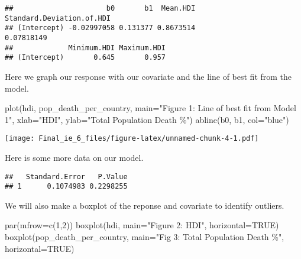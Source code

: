 \documentclass[
  12pt,
]{article}
\newenvironment{Shaded}{\begin{snugshade}}{\end{snugshade}}
\newcommand{\AttributeTok}[1]{\textcolor[rgb]{0.77,0.63,0.00}{#1}}
\newcommand{\ConstantTok}[1]{\textcolor[rgb]{0.00,0.00,0.00}{#1}}
\newcommand{\DecValTok}[1]{\textcolor[rgb]{0.00,0.00,0.81}{#1}}
\newcommand{\FunctionTok}[1]{\textcolor[rgb]{0.00,0.00,0.00}{#1}}
\newcommand{\NormalTok}[1]{#1}
\newcommand{\OtherTok}[1]{\textcolor[rgb]{0.56,0.35,0.01}{#1}}
\newcommand{\SpecialCharTok}[1]{\textcolor[rgb]{0.00,0.00,0.00}{#1}}
\newcommand{\StringTok}[1]{\textcolor[rgb]{0.31,0.60,0.02}{#1}}
\begin{document}
\begin{verbatim}
##                      b0       b1  Mean.HDI Standard.Deviation.of.HDI
## (Intercept) -0.02997058 0.131377 0.8673514                0.07818149
##             Minimum.HDI Maximum.HDI
## (Intercept)       0.645       0.957
\end{verbatim}

Here we graph our response with our covariate and the line of best fit
from the model.

\begin{Shaded}
\begin{Highlighting}[]
\FunctionTok{plot}\NormalTok{(hdi, pop\_death\_per\_country, }\AttributeTok{main=}\StringTok{"Figure 1: Line of best fit from Model 1"}\NormalTok{, }\AttributeTok{xlab=}\StringTok{"HDI"}\NormalTok{, }\AttributeTok{ylab=}\StringTok{"Total Population Death \%"}\NormalTok{)}
\FunctionTok{abline}\NormalTok{(b0, b1, }\AttributeTok{col=}\StringTok{"blue"}\NormalTok{)}
\end{Highlighting}
\end{Shaded}

\texttt{[image: Final\_ie\_6\_files/figure-latex/unnamed-chunk-4-1.pdf]}

Here is some more data on our model.

\begin{Shaded}
\end{Shaded}

\begin{verbatim}
##   Standard.Error   P.Value
## 1      0.1074983 0.2298255
\end{verbatim}

We will also make a boxplot of the reponse and covariate to identify
outliers.

\begin{Shaded}
\begin{Highlighting}[]
\FunctionTok{par}\NormalTok{(}\AttributeTok{mfrow=}\FunctionTok{c}\NormalTok{(}\DecValTok{1}\NormalTok{,}\DecValTok{2}\NormalTok{))}
\FunctionTok{boxplot}\NormalTok{(hdi, }\AttributeTok{main=}\StringTok{"Figure 2: HDI"}\NormalTok{, }\AttributeTok{horizontal=}\ConstantTok{TRUE}\NormalTok{)}
\FunctionTok{boxplot}\NormalTok{(pop\_death\_per\_country, }\AttributeTok{main=}\StringTok{"Fig 3: Total Population Death \%"}\NormalTok{, }\AttributeTok{horizontal=}\ConstantTok{TRUE}\NormalTok{)}
\end{Highlighting}
\end{Shaded}
\end{document}
